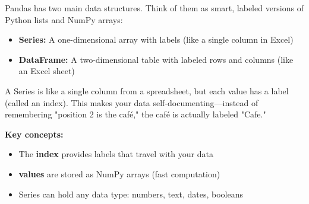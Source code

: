 Pandas has two main data structures. Think of them as smart, labeled versions of Python lists and NumPy arrays:

\begin{itemize}
\item \textbf{Series:} A one-dimensional array with labels (like a single column in Excel)
\item \textbf{DataFrame:} A two-dimensional table with labeled rows and columns (like an Excel sheet)
\end{itemize}



A Series is like a single column from a spreadsheet, but each value has a label (called an index). This makes your data self-documenting---instead of remembering "position 2 is the café," the café is actually labeled "Cafe."


\textbf{Key concepts:}
\begin{itemize}
\item The \textbf{index} provides labels that travel with your data
\item \textbf{values} are stored as NumPy arrays (fast computation)
\item Series can hold any data type: numbers, text, dates, booleans
\end{itemize}

